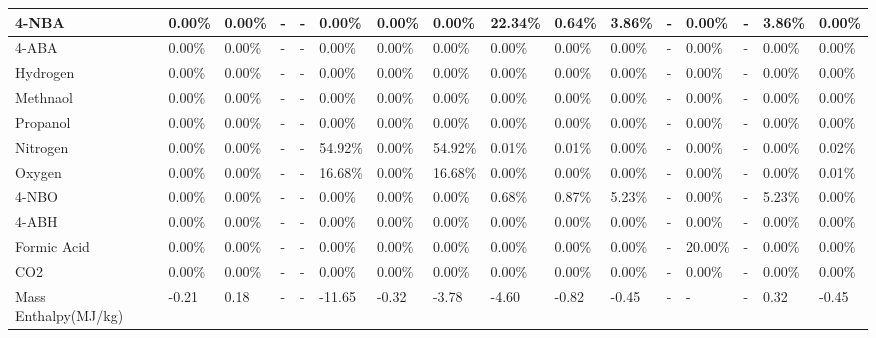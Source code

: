 \begin{landscape}
\begin{table}[H]
\begin{tabular}{|l|l|l|l|l|l|l|l|l|l|l|l|l|l|l|l|}
4-NBA                   & 0.00\%   & 0.00\%   & -    & -    & 0.00\%  & 0.00\%   & 0.00\%  & 22.34\% & 0.64\%  & 3.86\%  & -    & 0.00\%  & -    & 3.86\%  & 0.00\%  \\ \hline
4-ABA                   & 0.00\%   & 0.00\%   & -    & -    & 0.00\%  & 0.00\%   & 0.00\%  & 0.00\%  & 0.00\%  & 0.00\%  & -    & 0.00\%  & -    & 0.00\%  & 0.00\%  \\ \hline
Hydrogen                & 0.00\%   & 0.00\%   & -    & -    & 0.00\%  & 0.00\%   & 0.00\%  & 0.00\%  & 0.00\%  & 0.00\%  & -    & 0.00\%  & -    & 0.00\%  & 0.00\%  \\ \hline
Methnaol                & 0.00\%   & 0.00\%   & -    & -    & 0.00\%  & 0.00\%   & 0.00\%  & 0.00\%  & 0.00\%  & 0.00\%  & -    & 0.00\%  & -    & 0.00\%  & 0.00\%  \\ \hline
Propanol                & 0.00\%   & 0.00\%   & -    & -    & 0.00\%  & 0.00\%   & 0.00\%  & 0.00\%  & 0.00\%  & 0.00\%  & -    & 0.00\%  & -    & 0.00\%  & 0.00\%  \\ \hline
Nitrogen                & 0.00\%   & 0.00\%   & -    & -    & 54.92\% & 0.00\%   & 54.92\% & 0.01\%  & 0.01\%  & 0.00\%  & -    & 0.00\%  & -    & 0.00\%  & 0.02\%  \\ \hline
Oxygen                  & 0.00\%   & 0.00\%   & -    & -    & 16.68\% & 0.00\%   & 16.68\% & 0.00\%  & 0.00\%  & 0.00\%  & -    & 0.00\%  & -    & 0.00\%  & 0.01\%  \\ \hline
4-NBO                   & 0.00\%   & 0.00\%   & -    & -    & 0.00\%  & 0.00\%   & 0.00\%  & 0.68\%  & 0.87\%  & 5.23\%  & -    & 0.00\%  & -    & 5.23\%  & 0.00\%  \\ \hline
4-ABH                   & 0.00\%   & 0.00\%   & -    & -    & 0.00\%  & 0.00\%   & 0.00\%  & 0.00\%  & 0.00\%  & 0.00\%  & -    & 0.00\%  & -    & 0.00\%  & 0.00\%  \\ \hline
Formic Acid             & 0.00\%   & 0.00\%   & -    & -    & 0.00\%  & 0.00\%   & 0.00\%  & 0.00\%  & 0.00\%  & 0.00\%  & -    & 20.00\% & -    & 0.00\%  & 0.00\%  \\ \hline
CO2                     & 0.00\%   & 0.00\%   & -    & -    & 0.00\%  & 0.00\%   & 0.00\%  & 0.00\%  & 0.00\%  & 0.00\%  & -    & 0.00\%  & -    & 0.00\%  & 0.00\%  \\ \hline
Mass Enthalpy(MJ/kg)    & -0.21    & 0.18     & -    & -    & -11.65  & -0.32    & -3.78   & -4.60   & -0.82   & -0.45   & -    & -       & -    & 0.32    & -0.45   \\ \hline
\end{tabular}
\end{table}



\end{landscape}
